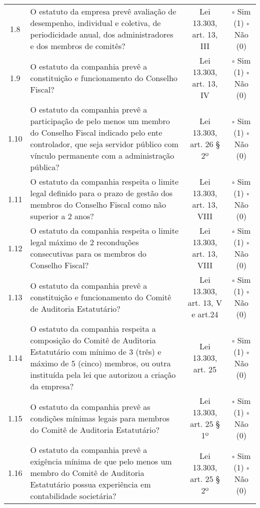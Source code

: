 \begin{center}
\begin{longtable}{c l c c}
1.8 &\parbox[t]{8cm}{O estatuto da empresa prevê avaliação de desempenho, individual e coletiva, de periodicidade anual, dos administradores e dos membros de comitês?} & \parbox[t]{2cm}{Lei 13.303, art. 13, III} & \parbox[t]{2cm}{$\square$ Sim (1) \\ $\square$ Não (0)}\\
1.9 &\parbox[t]{8cm}{O estatuto da companhia prevê a constituição e funcionamento do Conselho Fiscal?} & \parbox[t]{2cm}{Lei 13.303, art. 13, IV} & \parbox[t]{2cm}{$\square$ Sim (1) \\ $\square$ Não (0)}\\
1.10 &\parbox[t]{8cm}{O estatuto da companhia prevê a participação de pelo menos um membro do Conselho Fiscal indicado pelo ente controlador, que seja servidor público com vínculo permanente com a administração pública?} & \parbox[t]{2cm}{Lei 13.303, art. 26 § 2º} & \parbox[t]{2cm}{$\square$ Sim (1) \\ $\square$ Não (0)}\\
1.11 &\parbox[t]{8cm}{O estatuto da companhia respeita o limite legal definido para o prazo de gestão dos membros do Conselho Fiscal como não superior a 2 anos?} & \parbox[t]{2cm}{Lei 13.303, art. 13, VIII} & \parbox[t]{2cm}{$\square$ Sim (1) \\ $\square$ Não (0)}\\
1.12 &\parbox[t]{8cm}{O estatuto da companhia respeita o limite legal máximo de 2 reconduções consecutivas para os membros do Conselho Fiscal?} & \parbox[t]{2cm}{Lei 13.303, art. 13, VIII} & \parbox[t]{2cm}{$\square$ Sim (1) \\ $\square$ Não (0)}\\
1.13 &\parbox[t]{8cm}{O estatuto da companhia prevê a constituição e funcionamento do Comitê de Auditoria Estatutário?} & \parbox[t]{2cm}{Lei 13.303, art. 13, V e art.24} & \parbox[t]{2cm}{$\square$ Sim (1) \\ $\square$ Não (0)}\\
1.14 &\parbox[t]{8cm}{O estatuto da companhia respeita a composição do Comitê de Auditoria Estatutário com mínimo de 3 (três) e máximo de 5 (cinco) membros, ou outra instituída pela lei que autorizou a criação da empresa?} & \parbox[t]{2cm}{Lei 13.303, art. 25} & \parbox[t]{2cm}{$\square$ Sim (1) \\ $\square$ Não (0)}\\
1.15 &\parbox[t]{8cm}{O estatuto da companhia prevê as condições mínimas legais para membros do Comitê de Auditoria Estatutário?} & \parbox[t]{2cm}{Lei 13.303, art. 25 § 1º} & \parbox[t]{2cm}{$\square$ Sim (1) \\ $\square$ Não (0)}\\
1.16 &\parbox[t]{8cm}{O estatuto da companhia prevê a exigência mínima de que pelo menos um membro do Comitê de Auditoria Estatutário possua experiência em contabilidade societária?} & \parbox[t]{2cm}{Lei 13.303, art. 25 § 2º} & \parbox[t]{2cm}{$\square$ Sim (1) \\ $\square$ Não (0)}\\
\end{longtable}
\end{center}
\pagebreak

